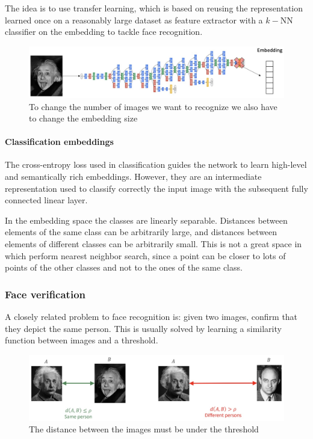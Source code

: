 The idea is to use transfer learning, which is based on reusing the representation learned once on a reasonably large dataset as feature extractor with a $k-$NN classifier on the embedding to tackle face recognition.

\begin{figure}[htbp]
  \centering
  \includegraphics[width=0.7\linewidth]{./img/face_recognition.jpg}
  \caption{To change the number of images we want to recognize we also have to change the embedding size}
\end{figure}

\paragraph{Classification embeddings}
The cross-entropy loss used in classification guides the network to learn high-level and semantically rich embeddings.
However, they are an intermediate representation used to classify correctly the input image with the subsequent fully connected linear layer.

In the embedding space the classes are linearly separable.
Distances between elements of the same class can be arbitrarily large, and distances between elements of different classes can be arbitrarily small.
This is not a great space in which perform nearest neighbor search, since a point can be closer to lots of points of the other classes and not to the ones of the same class.

\subsubsection{Face verification}
A closely related problem to face recognition is: given two images, confirm that they depict the same person.
This is usually solved by learning a similarity function between images and a threshold.

\begin{figure}[htbp]
  \centering
  \includegraphics[width=0.8\linewidth]{./img/face_verification.jpg}
  \caption{The distance between the images must be under the threshold}
\end{figure}

